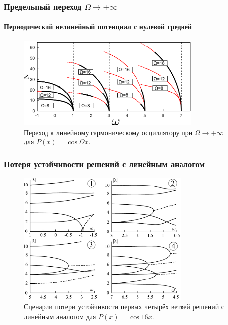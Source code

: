 \documentclass [10pt] {beamer}
\begin{document}
\begin{frame}
	\frametitle{Предельный переход $\Omega \to +\infty$}
	\framesubtitle{Периодический нелинейный потенциал с нулевой средней}
	
	\begin{figure}
		\includegraphics[width=0.8\textwidth]{pic/linear_oscillator_limit.pdf}
		\caption{Переход к линейному гармоническому осциллятору при $\Omega \to +\infty$ для $P(x) = \cos \Omega x$.}
		\label{pic:linear_limit}
	\end{figure}
\end{frame}

\begin{frame}
	\frametitle{Потеря устойчивости решений с линейным аналогом}
	
	\begin{figure}
		\includegraphics[width=0.75\textwidth]{pic/stability_loss.pdf}
		\caption{Сценарии потери устойчивости первых четырёх ветвей  решений с линейным аналогом для $P(x) = \cos 16 x$.}
		\label{pic:stability_loss}
	\end{figure}
\end{frame}

\end{document}
